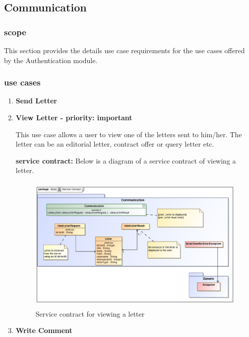 \documentclass[12pt]{article}
\begin{document}
\subsection{Communication}

\subsubsection{scope}
\par{This section provides the details use case requirements for the use cases offered by the Authentication
module.}

\subsubsection{use cases}

\begin{enumerate}
\item \textbf{Send Letter}
\item \textbf{View Letter - priority: important}\\
\par{This use case allows a user to view one of the letters sent to him/her. The letter can be an editorial letter, contract offer or query letter etc.}

\textbf{service contract:} Below is a diagram of a service contract of viewing a letter.

\begin{figure}[h]
\includegraphics[height=250px, width=500px]{epsImages/Communication/viewLetterServiceContract.eps}
\caption{Service contract for viewing a letter}
\end{figure}
\newpage

\item \textbf{Write Comment}

\end{enumerate}
\end{document}
